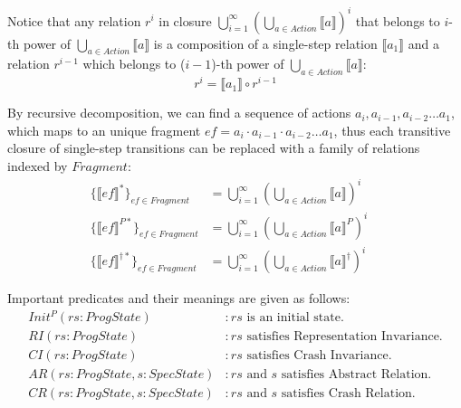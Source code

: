\documentclass[letterpaper,twocolumn,10pt]{article}
\theoremstyle{definition}
\renewcommand{\i}[1]{\ensuremath{\mathit{#1}}}
\begin{document}
Notice that any relation $r^i$ in closure $\bigcup_{i=1}^\infty\left(\bigcup_{a \in Action} \llbracket a \rrbracket \right)^i$ that belongs to $i$-th power of $\bigcup_{a \in Action} \llbracket a \rrbracket$ is a composition of a single-step relation $\llbracket a_1 \rrbracket$ and a relation $r^{i-1}$ which belongs to (${i-1}$)-th power of $\bigcup_{a \in Action} \llbracket a \rrbracket$:
$$r^i = \llbracket a_1 \rrbracket \circ r^{i-1}$$

By recursive decomposition, we can find a sequence of actions $a_i, a_{i-1}, a_{i-2} \dots a_1$, which maps to an unique fragment $\i{ef} = a_i \cdot a_{i-1} \cdot a_{i-2} \dots a_1$, thus each transitive closure of single-step transitions can be replaced with a family of relations indexed by $\i {Fragment}$:
\begin{align*}
	\{ \llbracket \i{ef} \rrbracket^* \}_\i{ef \in Fragment} &= 
	\bigcup_{i=1}^\infty\left(\bigcup_{a \in Action} \llbracket a \rrbracket \right)^i \quad\\
	\{ \llbracket \i{ef} \rrbracket^{P*} \}_\i{ef \in Fragment} &= 
	\bigcup_{i=1}^\infty\left(\bigcup_{a \in Action} \llbracket a \rrbracket^P \right)^i \quad\\
	\{ \llbracket \i{ef} \rrbracket^{\dagger*} \}_\i{ef \in Fragment} &= 
	\bigcup_{i=1}^\infty\left(\bigcup_{a \in Action} \llbracket a \rrbracket^\dagger \right)^i
\end{align*}

Important predicates and their meanings are given as follows:
\begin{align*}
	\i{Init^P(rs : ProgState)} &: \text{$\i{rs}$ is an initial state.}\\
	\i{RI(rs : ProgState)} &: \text{$\i{rs}$ satisfies Representation Invariance.} \\
	\i{CI(rs : ProgState)} &: \text{$\i{rs}$ satisfies Crash Invariance.} \\
	\i{AR(rs : ProgState, s : SpecState)} &: \text{$\i{rs}$ and $s$ satisfies Abstract Relation.} \\
	\i{CR(rs : ProgState, s : SpecState)} &: \text{$\i{rs}$ and $s$ satisfies Crash Relation.} \\
\end{align*}
\end{document}
